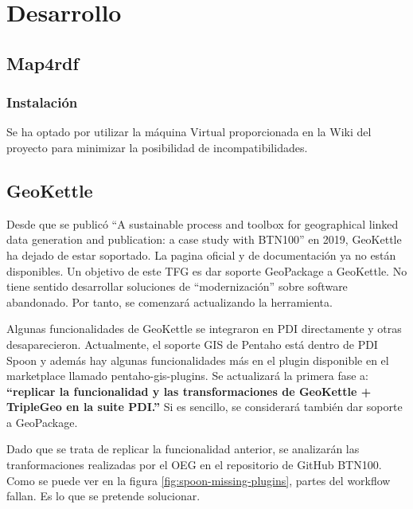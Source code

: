 \chapter{Desarrollo}

\section{Map4rdf}
\subsection{Instalación}

Se ha optado por utilizar la máquina Virtual proporcionada en la Wiki del proyecto para minimizar la posibilidad
de incompatibilidades.

\section{GeoKettle}

Desde que se publicó ``A sustainable process and toolbox for geographical linked data generation and
publication: a case study with BTN100'' en 2019, GeoKettle ha dejado de estar soportado. La pagina oficial y de
documentación ya no están disponibles.
Un objetivo de este TFG es dar soporte GeoPackage a GeoKettle. No tiene sentido desarrollar soluciones de
``modernización'' sobre software abandonado. Por tanto, se comenzará actualizando la herramienta.

Algunas funcionalidades de GeoKettle se integraron en PDI directamente y otras desaparecieron. 
Actualmente, el soporte GIS de Pentaho está dentro de PDI Spoon y además hay algunas funcionalidades más en
 el plugin disponible en el marketplace llamado pentaho-gis-plugins. Se actualizará la primera fase a:
\textbf{``replicar la funcionalidad y las transformaciones de GeoKettle + TripleGeo en la suite PDI.''} Si es sencillo,
se considerará también dar soporte a GeoPackage.

Dado que se trata de replicar la funcionalidad anterior, se analizarán las tranformaciones realizadas por el OEG
en el repositorio de GitHub BTN100. Como se puede ver en la figura \ref{fig:spoon-missing-plugins}, partes del
workflow fallan. Es lo que se pretende solucionar.

